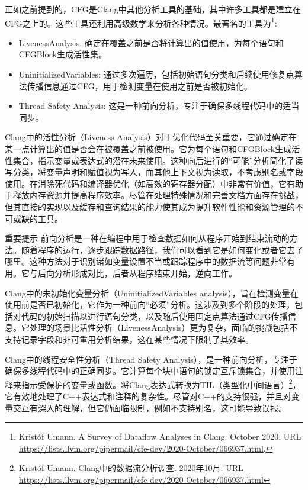 
正如之前提到的，CFG是Clang中其他分析工具的基础，其中许多工具都是建立在CFG之上的。这些工具还利用高级数学来分析各种情况。最著名的工具为\footnote{Kristóf Umann. A Survey of Dataflow Analyses in Clang. October 2020. URL \url{https://lists.llvm.org/pipermail/cfe-dev/2020-October/066937.html}.}:

\begin{itemize}
\item
LivenessAnalysis: 确定在覆盖之前是否将计算出的值使用，为每个语句和CFGBlock生成活性集。

\item
UninitializedVariables: 通过多次遍历，包括初始语句分类和后续使用修复点算法传播信息通过CFG，用于检测变量在使用之前是否被初始化。

\item
Thread Safety Analysis: 这是一种前向分析，专注于确保多线程代码中的适当同步。
\end{itemize}

Clang中的活性分析（Liveness Analysis）对于优化代码至关重要，它通过确定在某一点计算出的值是否会在被覆盖之前被使用。它为每个语句和CFGBlock生成活性集合，指示变量或表达式的潜在未来使用。这种向后进行的“可能”分析简化了读写分类，将变量声明和赋值视为写入，而其他上下文视为读取，不考虑别名或字段使用。在消除死代码和编译器优化（如高效的寄存器分配）中非常有价值，它有助于释放内存资源并提高程序效率。尽管在处理特殊情况和完善文档方面存在挑战，但其直接的实现以及缓存和查询结果的能力使其成为提升软件性能和资源管理的不可或缺的工具。

\begin{myNotic}{重要提示}
前向分析是一种在编程中用于检查数据如何从程序开始到结束流动的方法。随着程序的运行，逐步跟踪数据路径，我们可以看到它是如何变化或者它去了哪里。这种方法对于识别诸如变量设置不当或跟踪程序中的数据流等问题非常有用。它与后向分析形成对比，后者从程序结束开始，逆向工作。
\end{myNotic}

Clang中的未初始化变量分析（UninitializedVariables analysis），旨在检测变量在使用前是否已初始化，它作为一种前向“必须”分析。这涉及到多个阶段的处理，包括对代码的初始扫描以进行语句分类，以及随后使用固定点算法通过CFG传播信息。它处理的场景比活性分析（LivenessAnalysis）更为复杂，面临的挑战包括不支持记录字段和非可重用分析结果，这在某些情况下限制了其效率。

Clang中的线程安全性分析（Thread Safety Analysis），是一种前向分析，专注于确保多线程代码中的正确同步。它计算每个块中语句的锁定互斥锁集合，并使用注释来指示受保护的变量或函数。将Clang表达式转换为TIL（类型化中间语言）\footnote{Kristóf Umann. Clang中的数据流分析调查. 2020年10月. URL \url{https://lists.llvm.org/pipermail/cfe-dev/2020-October/066937.html}}，它有效地处理了C++表达式和注释的复杂性。尽管对C++的支持很强，并且对变量交互有深入的理解，但它仍面临限制，例如不支持别名，这可能导致误报。









